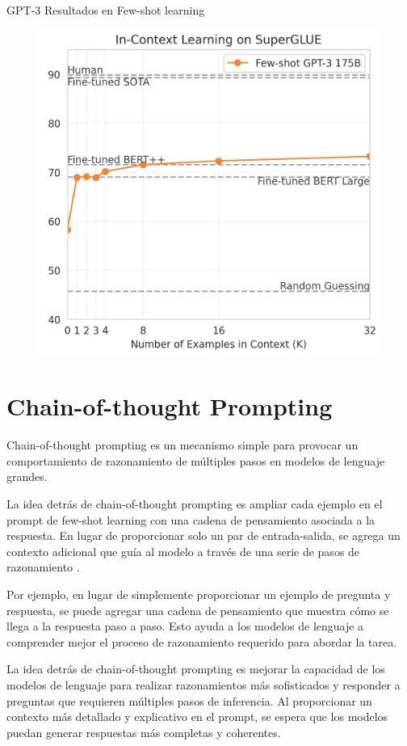 GPT-3 Resultados en Few-shot learning
 \begin{figure}[h]
        	\includegraphics[scale = 0.15]{pics/fewshotresults.png}
        \end{figure}



\section{Chain-of-thought Prompting}
Chain-of-thought prompting es un mecanismo simple para provocar un comportamiento de razonamiento de múltiples pasos en modelos de lenguaje grandes.

La idea detrás de chain-of-thought prompting es ampliar cada ejemplo en el prompt de few-shot learning con una cadena de pensamiento asociada a la respuesta. En lugar de proporcionar solo un par de entrada-salida, se agrega un contexto adicional que guía al modelo a través de una serie de pasos de razonamiento \cite{wei2022chain}.

Por ejemplo, en lugar de simplemente proporcionar un ejemplo de pregunta y respuesta, se puede agregar una cadena de pensamiento que muestra cómo se llega a la respuesta paso a paso. Esto ayuda a los modelos de lenguaje a comprender mejor el proceso de razonamiento requerido para abordar la tarea.

La idea detrás de chain-of-thought prompting es mejorar la capacidad de los modelos de lenguaje para realizar razonamientos más sofisticados y responder a preguntas que requieren múltiples pasos de inferencia. Al proporcionar un contexto más detallado y explicativo en el prompt, se espera que los modelos puedan generar respuestas más completas y coherentes.

